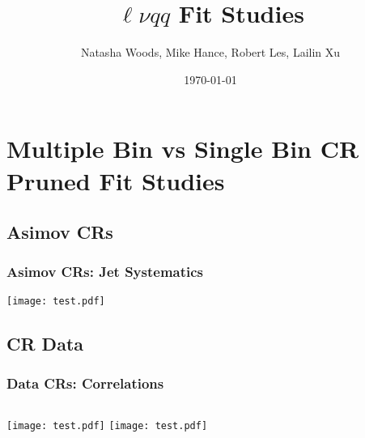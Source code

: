 \documentclass{beamer}
\title[$\ell\nu qq$ Fit Studies]{$\ell\nu qq$ Fit Studies} %
\author[Natasha Woods]{Natasha Woods, Mike Hance, Robert Les, Lailin Xu} %
\date{\today} %
\begin{document}
\begin{frame}
\titlepage %
\end{frame}

\begin{frame}
\tableofcontents
\end{frame}



\section{Multiple Bin vs Single Bin CR Pruned Fit Studies} %

\subsection{Asimov CRs} %
\begin{frame}
\frametitle{Asimov CRs: Jet Systematics}
       \texttt{[image: test.pdf]}
\end{frame}


\subsection{CR Data}
\begin{frame}
\frametitle{Data CRs: Correlations}
    \begin{columns}[t]
     \texttt{[image: test.pdf]}
      \texttt{[image: test.pdf]}
\end{columns}
\end{frame}
\end{document}
